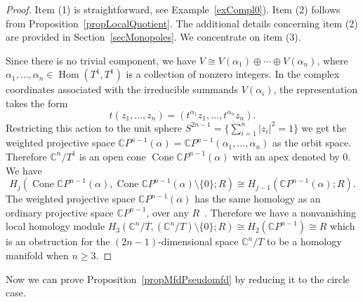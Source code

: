 \documentclass[english,12pt,oneside]{amsproc}
\DeclareMathOperator{\Cone}{Cone} \DeclareMathOperator{\pt}{pt}
\DeclareMathOperator{\Hom}{Hom} \DeclareMathOperator{\rk}{rk}
\newcommand{\Co}{\mathbb{C}}
\newcommand{\CP}{\mathbb{C}P}
\numberwithin{equation}{section}
\theoremstyle{plain}
\theoremstyle{definition}
\theoremstyle{remark}
\begin{document}
\begin{proof}
Item (1) is straightforward, see Example~\ref{exCompl0}). Item (2) follows from Proposition~\ref{propLocalQuotient}. The additional details concerning item (2) are provided in Section~\ref{secMonopoles}. We concentrate on item (3).

Since there is no trivial component, we have $V\cong V(\alpha_1)\oplus\cdots\oplus V(\alpha_n)$, where $\alpha_1,\ldots,\alpha_n\in\Hom(T^1,T^1)$ is a collection of nonzero integers. In the complex coordinates associated with the irreducible summands $V(\alpha_i)$, the representation takes the form
\[
t(z_1,\ldots,z_n)=(t^{\alpha_1}z_1,\ldots,t^{\alpha_n}z_n).
\]
Restricting this action to the unit sphere $S^{2n-1}=\{\sum_{i=1}^{n}|z_i|^2=1\}$ we get the weighted projective space $\CP^{n-1}(\alpha)=\CP^{n-1}(\alpha_1,\ldots,\alpha_n)$ as the orbit space. Therefore $\Co^n/T^1$ is an open cone $\Cone\CP^{n-1}(\alpha)$ with an apex denoted by $0$. We have
\[
H_j(\Cone\CP^{n-1}(\alpha),\Cone\CP^{n-1}(\alpha)\setminus\{0\};R)\cong H_{j-1}(\CP^{n-1}(\alpha);R).
\]
The weighted projective space $\CP^{n-1}(\alpha)$ has the same homology as an ordinary projective space $\CP^{n-1}$, over any $R$~\cite{Kawa}. Therefore we have a nonvanishing local homology module $H_3(\Co^n/T,(\Co^n/T)\setminus\{0\};R)\cong H_2(\CP^{n-1})\cong R$ which is an obstruction for the $(2n-1)$-dimensional space $\Co^n/T$ to be a homology manifold when $n\geqslant 3$.
\end{proof}

Now we can prove Proposition~\ref{propMfdPseudomfd} by reducing it to the circle case.
\end{document}
